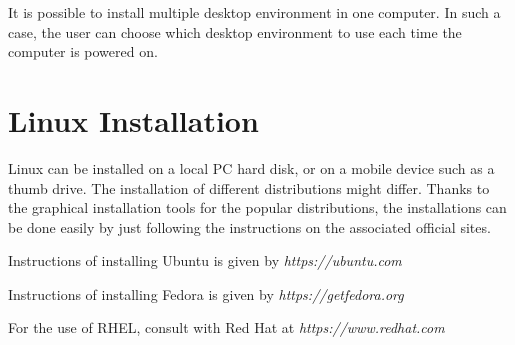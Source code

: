 It is possible to install multiple desktop environment in one computer. In such a case, the user can choose which desktop environment to use each time the computer is powered on.

\section{Linux Installation}

Linux can be installed on a local PC hard disk, or on a mobile device such as a thumb drive. The installation of different distributions might differ. Thanks to the graphical installation tools for the popular distributions, the installations can be done easily by just following the instructions on the associated official sites.

Instructions of installing Ubuntu is given by \textit{https://ubuntu.com}

Instructions of installing Fedora is given by \textit{https://getfedora.org}

For the use of RHEL, consult with Red Hat at \textit{https://www.redhat.com}











